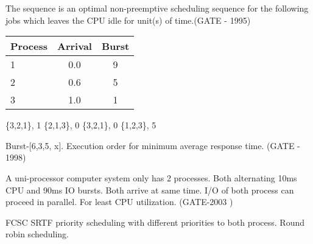 \begin{questyle}

  \question  The sequence \fillin[] is an optimal non-preemptive scheduling sequence for the following jobs
             which leaves the CPU idle for \fillin[] unit(s) of time.(GATE - 1995)

  \begin{myTableStyle}
    \begin{center}
    \begin{tabular}{ |l|c|c| } \hline
        Process &   Arrival & Burst    \\ \hline
        1      &   0.0       & 9         \\ \hline
        2      &   0.6       & 5         \\ \hline
        3      &   1.0       & 1         \\ \hline
    \end{tabular}
    \end{center}
  \end{myTableStyle}
  \vspace{0.08in}
  \begin{oneparchoices}
    \CorrectChoice \{3,2,1\}, 1
    \choice \{2,1,3\}, 0
    \choice \{3,2,1\}, 0
    \choice \{1,2,3\}, 5
  \end{oneparchoices}

  \end{questyle}





\begin{questyle}

  \question  Burst-[6,3,5, x]. Execution order for minimum average response time. (GATE - 1998)


  \end{questyle}





\begin{questyle}

  \question  A uni-processor computer system only has 2 processes. Both alternating 10ms CPU and 90ms IO bursts.
             Both arrive at same time. I/O of both process can proceed in parallel. For least CPU utilization. (GATE-2003 )

  \begin{choices}
    \choice FCSC
    \choice SRTF
    \choice priority scheduling with different priorities to both process.
    \CorrectChoice Round robin scheduling.
  \end{choices}


  \end{questyle}



